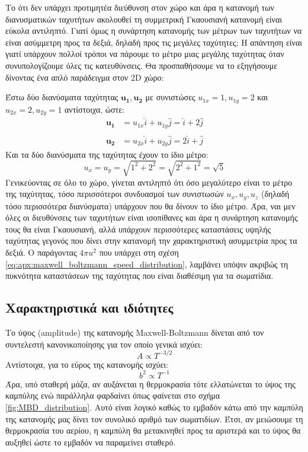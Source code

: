 Το ότι δεν υπάρχει προτιμητέα διεύθυνση στον χώρο και άρα η κατανομή των διανυσματικών ταχυτήτων ακολουθεί τη συμμετρική Γκαουσιανή κατανομή είναι εύκολα αντιληπτό. Γιατί όμως η συνάρτηση κατανομής των μέτρων των ταχυτήτων να είναι ασύμμετρη προς τα δεξιά, δηλαδή προς τις μεγάλες ταχύτητες; Η απάντηση είναι γιατί υπάρχουν πολλοί τρόποι να πάρουμε το μέτρο μιας μεγάλης ταχύτητας όταν συνυπολογίζουμε όλες τις κατευθύνσεις. Θα προσπαθήσουμε να το εξηγήσουμε δίνοντας ένα απλό παράδειγμα στον 2D χώρο:

Έστω δύο διανύσματα ταχύτητας $\boldsymbol{u_1}, \boldsymbol{u_2}$ με συνιστώσες $u_{1x}=1, u_{1y}=2$ και $u_{2x}=2, u_{2y}=1$ αντίστοιχα, ώστε:
\begin{align*}
    \boldsymbol{u_1} &= u_{1x} \hat{i} + u_{1y} \hat{j} = \hat{i} + 2 \hat{j} \\\\
    \boldsymbol{u_2} &= u_{2x} \hat{i} + u_{2y} \hat{j} = 2 \hat{i} +  \hat{j}
\end{align*}
Και τα δύο διανύσματα της ταχύτητας έχουν το ίδιο μέτρο: $$u_x = u_y = \sqrt{1^2 + 2^2} = \sqrt{2^2 + 1^2} = \sqrt{5}$$
Γενικεύοντας σε όλο το χώρο, γίνεται αντιληπτό ότι όσο μεγαλύτερο είναι το μέτρο της ταχύτητας, τόσο περισσότεροι συνδυασμοί των συνιστωσών $u_x, u_y, u_z$ (δηλαδή τόσο περισσότερα διανύσματα) υπάρχουν που θα δίνουν το ίδιο μέτρο. Άρα, ναι μεν όλες οι διευθύνσεις των ταχυτήτων είναι ισοπίθανες και άρα η συνάρτηση κατανομής τους θα είναι Γκαουσιανή, αλλά υπάρχουν περισσότερες καταστάσεις υψηλής ταχύτητας γεγονός που δίνει στην κατανομή την χαρακτηριστική ασυμμετρία προς τα δεξιά. 
Ο παράγοντας $4\pi u^2$ που υπάρχει στη σχέση \eqref{eq:apx:maxwell_boltzmann_speed_distribution}, λαμβάνει υπόψιν ακριβώς τη πυκνότητα καταστάσεων της ταχύτητας που είναι διαθέσιμη για τα σωματίδια.


\subsection{Χαρακτηριστικά και ιδιότητες}
Το ύψος (amplitude) της κατανομής Maxwell-Boltzmann δίνεται από τον συντελεστή κανονικοποίησης για τον οποίο γενικά ισχύει:
$$A \propto T^{-3/2}$$ 
Αντίστοιχα, για το εύρος της κατανομής ισχύει:
$$b^2 \propto T^{-1}$$
Άρα, υπό σταθερή μάζα, αν αυξάνεται η θερμοκρασία τότε ελλατώνεται το ύψος της καμπύλης ενώ παράλληλα φαρδαίνει όπως φαίνεται στο σχήμα \ref{fig:MBD_distribution}. Αυτό είναι λογικό καθώς το εμβαδόν κάτω από την καμπύλη της κατανομής μας δίνει τον συνολικό αριθμό των σωματιδίων. Έτσι, αν μειώσουμε τη θερμοκρασία του αερίου, η καμπύλη θα μετακινηθεί προς τα αριστερά και το ύψος θα αυξηθεί ώστε το εμβαδόν να παραμείνει σταθερό.

